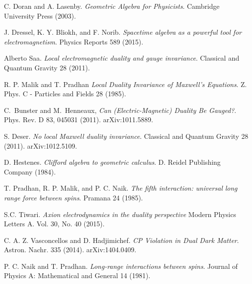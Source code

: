 \documentclass{article}
\begin{document}
  \begin{thebibliography}{9} 
      C. Doran and A. Lasenby.
      \emph{Geometric Algebra for Physicists}. Cambridge University Press (2003).

      J. Dressel, K. Y. Bliokh, and F. Norib.
      \emph{Spacetime algebra as a powerful tool for electromagnetism}.
      Physics Reports 589 (2015).

      Alberto Saa.
      \emph{Local electromagnetic duality and gauge invariance}.
      Classical and Quantum Gravity 28 (2011).

      R. P. Malik and T. Pradhan 
      \emph{Local Duality Invariance of Maxwell's Equations}.
      Z. Phys. C - Particles and Fields 28 (1985).

      C.~Bunster and M.~Henneaux,
        \emph{Can (Electric-Magnetic) Duality Be Gauged?}.
        Phys. Rev. D 83, 045031 (2011).
        arXiv:1011.5889.

        S. Deser.
        \emph{No local Maxwell duality invariance}.
        Classical and Quantum Gravity
        28 (2011).
        arXiv:1012.5109.

      D. Hestenes.
      \emph{Clifford algebra to geometric calculus}.
      D. Reidel Publishing Company (1984).

      T. Pradhan, R. P. Malik, and P. C. Naik.
      \emph{The fifth interaction: universal long range force between spins}.
      Pramana 24 (1985). 

      S.C. Tiwari.
      \emph{Axion electrodynamics in the duality perspective}
      Modern Physics Letters A.
      Vol. 30, No. 40 (2015).

      C. A. Z. Vasconcellos and D. Hadjimichef.
      \emph{CP Violation in Dual Dark Matter}.
      Astron. Nachr. 335 (2014).
      arXiv:1404.0409.

      P. C. Naik and T. Pradhan.
      \emph{Long-range interactions between spins}.
      Journal of Physics A: Mathematical and General 14 (1981).

  \end{thebibliography}
\end{document}
